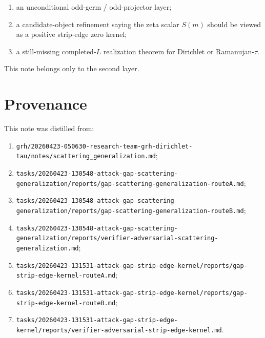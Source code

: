 \documentclass[11pt]{article}
\begin{document}
\begin{enumerate}
\item an unconditional odd-germ / odd-projector layer;
\item a candidate-object refinement saying the zeta scalar \(S(m)\) should be
viewed as a positive strip-edge zero kernel;
\item a still-missing completed-\(L\) realization theorem for Dirichlet or
Ramanujan-\(\tau\).
\end{enumerate}

This note belongs only to the second layer.

\section{Provenance}

This note was distilled from:

\begin{enumerate}
\item \texttt{grh/20260423-050630-research-team-grh-dirichlet-tau/notes/scattering_generalization.md};
\item \texttt{tasks/20260423-130548-attack-gap-scattering-generalization/reports/gap-scattering-generalization-routeA.md};
\item \texttt{tasks/20260423-130548-attack-gap-scattering-generalization/reports/gap-scattering-generalization-routeB.md};
\item \texttt{tasks/20260423-130548-attack-gap-scattering-generalization/reports/verifier-adversarial-scattering-generalization.md};
\item \texttt{tasks/20260423-131531-attack-gap-strip-edge-kernel/reports/gap-strip-edge-kernel-routeA.md};
\item \texttt{tasks/20260423-131531-attack-gap-strip-edge-kernel/reports/gap-strip-edge-kernel-routeB.md};
\item \texttt{tasks/20260423-131531-attack-gap-strip-edge-kernel/reports/verifier-adversarial-strip-edge-kernel.md}.
\end{enumerate}
\end{document}
